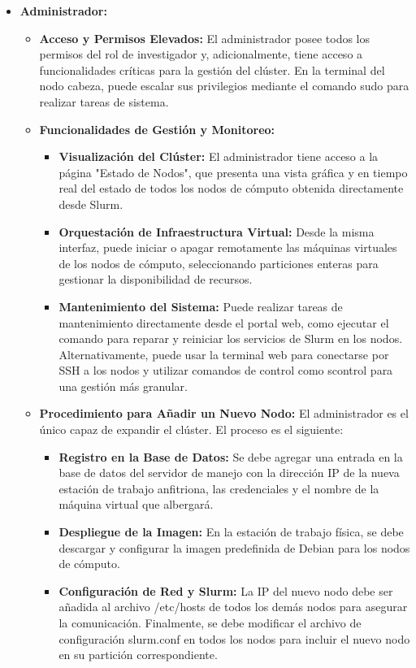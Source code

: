 \begin{itemize}
    \item \textbf{Administrador:} 
    \begin{itemize}
        \item \textbf{Acceso y Permisos Elevados:} El administrador posee todos los permisos del rol de investigador y, adicionalmente, tiene acceso a funcionalidades críticas para la gestión del clúster. En la terminal del nodo cabeza, puede escalar sus privilegios mediante el comando sudo para realizar tareas de sistema.
        \item \textbf{Funcionalidades de Gestión y Monitoreo:}
        \begin{itemize}
            \item \textbf{Visualización del Clúster:} El administrador tiene acceso a la página "Estado de Nodos", que presenta una vista gráfica y en tiempo real del estado de todos los nodos de cómputo obtenida directamente desde Slurm. 
            \item \textbf{Orquestación de Infraestructura Virtual:} Desde la misma interfaz, puede iniciar o apagar remotamente las máquinas virtuales de los nodos de cómputo, seleccionando particiones enteras para gestionar la disponibilidad de recursos.
            \item \textbf{Mantenimiento del Sistema:} Puede realizar tareas de mantenimiento directamente desde el portal web, como ejecutar el comando para reparar y reiniciar los servicios de Slurm en los nodos. Alternativamente, puede usar la terminal web para conectarse por SSH a los nodos y utilizar comandos de control como scontrol para una gestión más granular.
        \end{itemize}
        \item \textbf{Procedimiento para Añadir un Nuevo Nodo:} El administrador es el único capaz de expandir el clúster. El proceso es el siguiente:
        \begin{itemize}
            \item \textbf{Registro en la Base de Datos:} Se debe agregar una entrada en la base de datos del servidor de manejo con la dirección IP de la nueva estación de trabajo anfitriona, las credenciales y el nombre de la máquina virtual que albergará.
            \item \textbf{Despliegue de la Imagen:} En la estación de trabajo física, se debe descargar y configurar la imagen predefinida de Debian para los nodos de cómputo.
            \item \textbf{Configuración de Red y Slurm:} La IP del nuevo nodo debe ser añadida al archivo /etc/hosts de todos los demás nodos para asegurar la comunicación.  Finalmente, se debe modificar el archivo de configuración slurm.conf en todos los nodos para incluir el nuevo nodo en su partición correspondiente.
        \end{itemize}
    \end{itemize}
\end{itemize}
